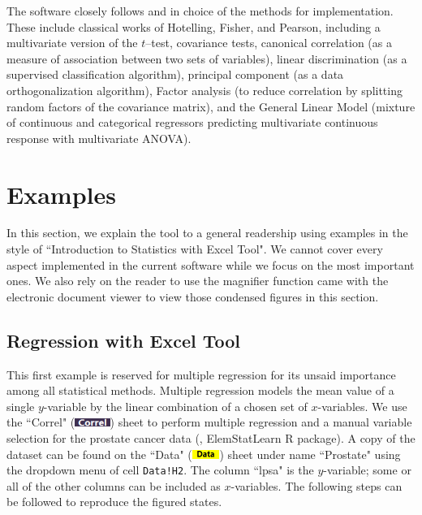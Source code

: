 \documentclass[article]{jss}
\numberwithin{equation}{subsection}
\newcommand{\shtData}{``Data" (\includegraphics[height=8pt, keepaspectratio=true]{DataSheetTab_png}) }
\newcommand{\shtCorrel}{``Correl" (\includegraphics[height=8pt, keepaspectratio=true]{CorrelSheetTab_png}) }
\begin{document}
  
        The software closely follows \cite{anderson2003introMVA3e} and \cite{johnson1992applied} in choice of the methods for implementation. These include classical works of Hotelling, Fisher, and Pearson, including a multivariate version of the  $t$--test, covariance tests, canonical correlation (as a measure of association between two sets of variables), linear discrimination (as a supervised classification algorithm),  principal component (as a data orthogonalization algorithm), Factor analysis (to reduce correlation by splitting random factors of the covariance matrix), and the General Linear Model (mixture of continuous and categorical regressors predicting multivariate continuous response with multivariate ANOVA).
  
  
        \section[example]{Examples}        
            In this section, we explain the tool to a general readership using examples in the style of ``Introduction to Statistics with Excel Tool". We cannot cover every aspect implemented in the current software while we focus on the most important ones. We also rely on the reader to use the magnifier function came with the electronic document viewer to view those condensed figures in this section.
                
        \subsection[egReg]{Regression with Excel Tool}
        This first example is reserved for multiple regression for its unsaid importance among all statistical methods. 
        Multiple regression models the mean value of a single $y$-variable by the linear combination of a chosen set of $x$-variables. 
        We use the \shtCorrel sheet to perform multiple regression and a manual variable selection for the prostate cancer data (\cite{stamey1989prostate}, ElemStatLearn R package). 
        A copy of the dataset can be found on the \shtData sheet under name ``Prostate" using the dropdown menu of cell \texttt{Data!H2}. 
        The column ``lpsa" is the $y$-variable; some or all of the other columns can be included as $x$-variables.
	    The following steps can be followed to reproduce the figured states.
	    
\end{document}
